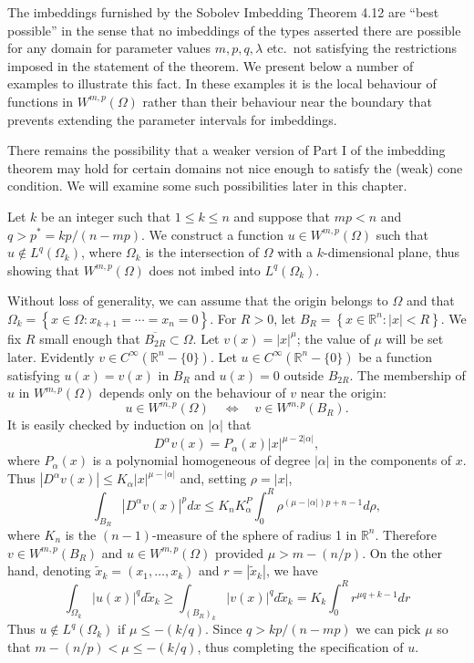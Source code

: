 \begin{para}
  The imbeddings furnished by the Sobolev Imbedding Theorem 4.12 are ``best possible'' in the sense that
  no imbeddings of the types asserted there are possible for any domain for parameter values $m, p, q, \lambda$ 
  etc.\ not satisfying the restrictions imposed in the statement of the theorem.
  We present below a number of examples to illustrate this fact.
  In these examples it is the local behaviour of functions in $W^{m,p}(\Omega)$ rather than their behaviour 
  near the boundary that prevents extending the parameter intervals for imbeddings.
  
  There remains the possibility that a weaker version of Part I of the imbedding theorem may hold for certain 
  domains not nice enough to satisfy the (weak) cone condition.
  We will examine some such possibilities later in this chapter.
\end{para}


\begin{example}
  Let $k$ be an integer such that $1 \leq k \leq n$ and suppose that $m p<n$ and $q>p^*=k p /(n-m p)$. We construct a function $u \in W^{m,p}(\Omega)$ such that $u \notin L^q(\Omega_k)$, where $\Omega_k$ is the intersection of $\Omega$ with a $k$-dimensional plane, thus showing that $W^{m,p}(\Omega)$ does not imbed into $L^q(\Omega_k)$.
  
  Without loss of generality, we can assume that the origin belongs to $\Omega$ and that $\Omega_k=\left\{x \in \Omega: x_{k+1}=\cdots=x_n=0\right\}$. For $R>0$, let $B_R=\left\{x \in \mathbb{R}^n:|x|<R\right\}$. We fix $R$ small enough that $\overline{B_{2 R}} \subset \Omega$. Let $v(x)=|x|^\mu$; the value of $\mu$ will be set later. Evidently $v \in C^{\infty}\left(\mathbb{R}^n-\{0\}\right)$. Let $u \in C^{\infty}\left(\mathbb{R}^n-\{0\}\right)$ be a function satisfying $u(x)=v(x)$ in $B_R$ and $u(x)=0$ outside $B_{2 R}$. The membership of $u$ in $W^{m,p}(\Omega)$ depends only on the behaviour of $v$ near the origin:
  \[
  u \in W^{m,p}(\Omega) \quad \Longleftrightarrow \quad v \in W^{m,p}\left(B_R\right) .
  \]
  It is easily checked by induction on $|\alpha|$ that
  \[
  D^\alpha v(x)=P_\alpha(x)|x|^{\mu-2|\alpha|},
  \]
  where $P_\alpha(x)$ is a polynomial homogeneous of degree $|\alpha|$ in the components of $x$. Thus $\left|D^\alpha v(x)\right| \leq K_\alpha|x|^{\mu-|\alpha|}$ and, setting $\rho=|x|$,
  \[
  \int_{B_R}\left|D^\alpha v(x)\right|^p d x \leq K_n K_\alpha^P \int_0^R \rho^{(\mu-|\alpha|) p+n-1} d \rho,
  \]
  where $K_n$ is the $(n-1)$-measure of the sphere of radius 1 in $\mathbb{R}^n$. Therefore $v \in W^{m,p}\left(B_R\right)$ and $u \in W^{m,p}(\Omega)$ provided $\mu>m-(n / p)$.
  On the other hand, denoting $\tilde{x}_k=\left(x_1, \ldots, x_k\right)$ and $r=\left|\tilde{x}_k\right|$, we have
  \[
  \int_{\Omega_k}|u(x)|^q d \tilde{x}_k \geq \int_{\left(B_R\right)_k}|v(x)|^q d \tilde{x}_k=K_k \int_0^R r^{\mu q+k-1} d r
  \]
  Thus $u \notin L^q(\Omega_k)$ if $\mu \leq-(k / q)$.
  Since $q>k p /(n-m p)$ we can pick $\mu$ so that $m-(n / p)<\mu \leq-(k / q)$, thus completing the specification of $u$.
\end{example}


